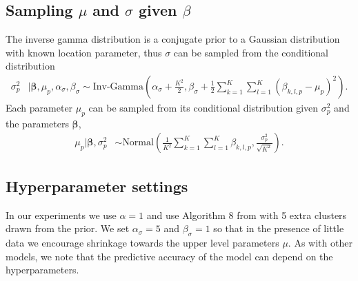 \subsection{Sampling $\mu$  and $\sigma$ given $\beta$ }

The inverse gamma distribution is a conjugate prior to a Gaussian distribution with known location parameter, thus $\sigma$ can be sampled from the conditional distribution
\begin{align}
\label{eqn:gibbs.sigma}
\sigma_p^2 &| \boldsymbol{\beta}, \mu_p,  \alpha_{\sigma}, \beta_{\sigma} \sim
 \mbox{Inv-Gamma}\left(\alpha_{\sigma} + \frac{K^2}{2}, \beta_{\sigma} + \frac{1}{2} \sum_{k=1}^K\sum_{l=1}^K (\beta_{k,l,p} - \mu_p)^2\right).
\end{align}
Each parameter $\mu_p$ can be sampled from its conditional distribution given $\sigma_p^2$ and the parameters $\boldsymbol{\beta}$,
\begin{align}
\label{eqn:gibbs.mu}
\mu_p | \boldsymbol{\beta},\sigma_p^2 &\sim \mbox{Normal}\left(\frac{1}{K^2}\sum_{k=1}^K \sum_{l=1}^K \beta_{k,l,p},\frac{ \sigma_p^2}{\sqrt{K^2}}\right).
\end{align}

\subsection{Hyperparameter settings}
In our experiments we use $\alpha=1$ and use Algorithm 8 from \cite{Neal2000} with 5 extra clusters drawn from the prior.%
We set $\alpha_{\sigma}=5$ and $\beta_{\sigma}=1$ so that in the presence of little data we encourage shrinkage towards the upper level parameters $\mu$.  
As with other models, we note that the predictive accuracy of the model can depend on the hyperparameters.
